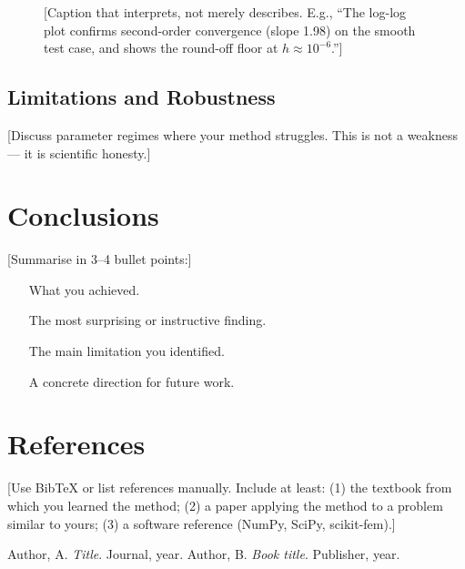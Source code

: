 \documentclass[11pt,a4paper]{article}
\theoremstyle{definition}
\theoremstyle{remark}
\begin{document}
\begin{figure}[H]
\centering
{}
\caption{[Caption that interprets, not merely describes. E.g., ``The log-log plot
confirms second-order convergence (slope 1.98) on the smooth test case, and shows
the round-off floor at $h \approx 10^{-6}$.'']}
\label{fig:convergence}
\end{figure}

\subsection{Limitations and Robustness}
[Discuss parameter regimes where your method struggles. This is not a weakness ---
it is scientific honesty.]

\newpage
\section{Conclusions}

[Summarise in 3--4 bullet points:]
\begin{itemize}[leftmargin=2em]
\item [What you achieved.]
\item [The most surprising or instructive finding.]
\item [The main limitation you identified.]
\item [A concrete direction for future work.]
\end{itemize}

\newpage
\section*{References}

[Use BibTeX or list references manually. Include at least: (1) the textbook from
which you learned the method; (2) a paper applying the method to a problem
similar to yours; (3) a software reference (NumPy, SciPy, scikit-fem).]

\begin{thebibliography}{9}
 Author, A. \emph{Title}. Journal, year.
 Author, B. \emph{Book title}. Publisher, year.
\end{thebibliography}
\end{document}
